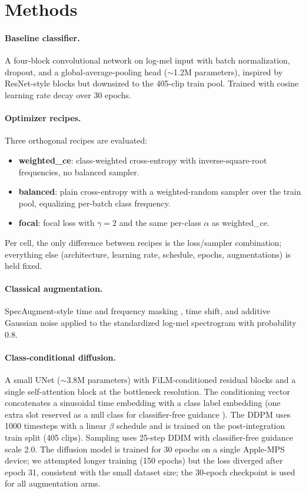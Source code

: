 \documentclass[10pt]{article}
\begin{document}
\section{Methods}\label{sec:approach}
\paragraph{Baseline classifier.} A four-block convolutional network on log-mel input with batch normalization, dropout, and a global-average-pooling head ($\sim$1.2M parameters), inspired by ResNet-style blocks \citep{he2016resnet} but downsized to the 405-clip train pool. Trained with cosine learning rate decay over 30 epochs.

\paragraph{Optimizer recipes.} Three orthogonal recipes are evaluated:
\begin{itemize}
    \item \textbf{weighted\_ce}: class-weighted cross-entropy with inverse-square-root frequencies, no balanced sampler.
    \item \textbf{balanced}: plain cross-entropy with a weighted-random sampler over the train pool, equalizing per-batch class frequency.
    \item \textbf{focal}: focal loss \citep{lin2017focal} with $\gamma=2$ and the same per-class $\alpha$ as weighted\_ce.
\end{itemize}
Per cell, the only difference between recipes is the loss/sampler combination; everything else (architecture, learning rate, schedule, epochs, augmentations) is held fixed.

\paragraph{Classical augmentation.} SpecAugment-style time and frequency masking \citep{park2019specaugment}, time shift, and additive Gaussian noise applied to the standardized log-mel spectrogram with probability 0.8.

\paragraph{Class-conditional diffusion.} A small UNet ($\sim$3.8M parameters) with FiLM-conditioned \citep{perez2018film} residual blocks and a single self-attention block at the bottleneck resolution. The conditioning vector concatenates a sinusoidal time embedding with a class label embedding (one extra slot reserved as a null class for classifier-free guidance \citep{ho2021classifier}). The DDPM uses 1000 timesteps with a linear $\beta$ schedule and is trained on the post-integration train split (405 clips). Sampling uses 25-step DDIM \citep{song2021ddim} with classifier-free guidance scale 2.0. The diffusion model is trained for 30 epochs on a single Apple-MPS device; we attempted longer training (150 epochs) but the loss diverged after epoch 31, consistent with the small dataset size; the 30-epoch checkpoint is used for all augmentation arms.
\end{document}
